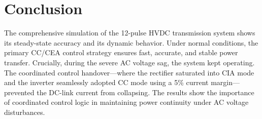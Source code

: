 \documentclass[12pt, a4paper]{article}
\begin{document}
\section{Conclusion}
The comprehensive simulation of the 12-pulse HVDC transmission system shows its steady-state accuracy and its dynamic behavior. Under normal conditions, the primary CC/CEA control strategy ensures fast, accurate, and stable power transfer. Crucially, during the severe AC voltage sag, the system kept operating. The coordinated control handover—where the rectifier saturated into CIA mode and the inverter seamlessly adopted CC mode using a 5\% current margin—prevented the DC-link current from collapsing. The results show the importance of coordinated control logic in maintaining power continuity under AC voltage disturbances.
\end{document}
